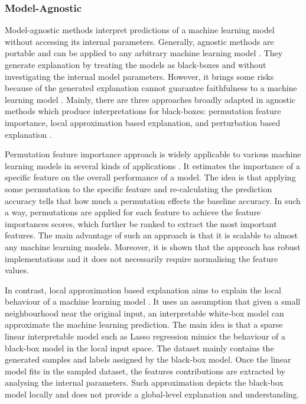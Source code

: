 \documentclass[english]{tktltiki2}
\theoremstyle{definition}
\theoremstyle{remark}
\begin{document}
\subsubsection{Model-Agnostic} %
Model-agnostic methods interpret predictions of a machine learning model without accessing its internal parameters. Generally, agnostic methods are portable and can be applied to any arbitrary machine learning model \citep{ribeiro2016model, bibal2016interpretability, molnarinterpretable}. They generate explanation by treating the models as black-boxes and without investigating the internal model parameters. However, it brings some risks because of the generated explanation cannot guarantee faithfulness to a machine learning model \citep{bibal2016interpretability, guidotti2018survey, miller2018explanation}. Mainly, there are three approaches broadly adapted in agnostic methods which produce interpretations for black-boxes: permutation feature importance, local approximation based explanation, and perturbation based explanation \citep{molnarinterpretable, murdoch2019interpretable}.

Permutation feature importance approach is widely applicable to various machine learning models in several kinds of applications \citep{molnarinterpretable, guidotti2018survey, murdoch2019interpretable}. It estimates the importance of a specific feature on the overall performance of a model. The idea is that applying some permutation to the specific feature and re-calculating the prediction accuracy tells that how much a permutation effects the baseline accuracy. In such a way, permutations are applied for each feature to achieve the feature importances scores, which further be ranked to extract the most important features. The main advantage of such an approach is that it is scalable to almost any machine learning models. Moreover, it is shown that the approach has robust implementations and it does not necessarily require normalising the feature values.

In contrast, local approximation based explanation aims to explain the local behaviour of a machine learning model \citep{ribeiro2016model, guidotti2018survey,molnarinterpretable, murdoch2019interpretable}. It uses an assumption that given a small neighbourhood near the original input, an interpretable white-box model can approximate the machine learning prediction. The main idea is that a sparse linear interpretable model such as Lasso regression mimics the behaviour of a black-box model in the local input space. The dataset mainly contains the generated samples and labels assigned by the black-box model. Once the linear model fits in the sampled dataset, the features contributions are extracted by analysing the internal parameters. Such approximation depicts the black-box model locally and does not provide a global-level explanation and understanding.
\end{document}
